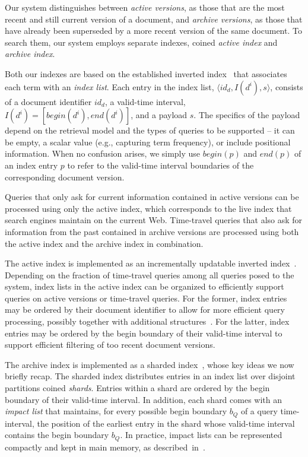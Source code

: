 Our system distinguishes between \emph{active versions}, as those that
are the most recent and still current version of a document, and
\emph{archive versions}, as those that have already been superseded by
a more recent version of the same document. To search them, our system
employs separate indexes, coined \emph{active index} and \emph{archive
  index}.

Both our indexes are based on the established inverted
index~\cite{DBLP:journals/csur/ZobelM06} that associates each term
with an \emph{index list}. Each entry in the index list, $\langle
id_{d}, I(d^{i}), s \rangle$, consists of a document identifier
$id_{d}$, a valid-time interval, $I(d^{i}) = [ begin(d^{i}),
end(d^{i})]$, and a payload $s$. The specifics of the payload depend
on the retrieval model and the types of queries to be supported -- it
can be empty, a scalar value (e.g., capturing term frequency), or
include positional information. When no confusion arises, we simply
use $begin(p)$ and $end(p)$ of an index entry $p$ to refer to the
valid-time interval boundaries of the corresponding document version.

Queries that only ask for current information contained in active
versions can be processed using only the active index, which
corresponds to the live index that search engines maintain on the
current Web. Time-travel queries that also ask for information from
the past contained in archive versions are processed using both the
active index and the archive index in combination.

The active index is implemented as an incrementally updatable inverted
index~\cite{Buttcher:2008fk,Lester:2008qf}. Depending on the fraction
of time-travel queries among all queries posed to the system, index
lists in the active index can be organized to efficiently support
queries on active versions or time-travel queries. For the former,
index entries may be ordered by their document identifier to allow for
more efficient query processing, possibly together with additional
structures~\cite{DBLP:conf/cikm/BroderCHSZ03,DBLP:conf/sigir/DingS11,DBLP:journals/tois/MoffatZ96,DBLP:conf/sigir/StrohmanC07}. For
the latter, index entries may be ordered by the begin boundary of
their valid-time interval to support efficient filtering of too recent
document versions.

The archive index is implemented as a sharded
index~\cite{aanand:sigir2011}, whose key ideas we now briefly
recap. The sharded index distributes entries in an index list over
disjoint partitions coined \emph{shards}. Entries within a shard are
ordered by the begin boundary of their valid-time interval. In
addition, each shard comes with an \emph{impact list} that maintains,
for every possible begin boundary $b_{Q}$ of a query time-interval,
the position of the earliest entry in the shard whose valid-time
interval contains the begin boundary $b_{Q}$. In practice, impact
lists can be represented compactly and kept in main memory, as
described~in~\cite{aanand:sigir2011}.


